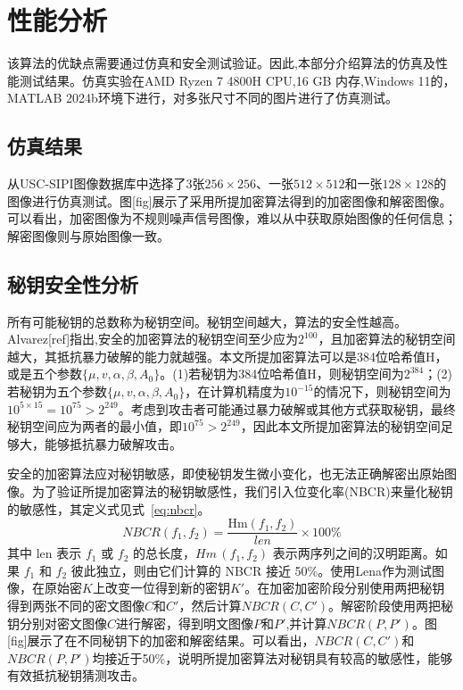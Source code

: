 \section{性能分析}
\label{sec:performance_analysis}

该算法的优缺点需要通过仿真和安全测试验证。因此,本部分介绍算法的仿真及性能测试结果。仿真实验在AMD Ryzen 7 4800H CPU,16 GB 内存,Windows 11的，MATLAB 2024b环境下进行，对多张尺寸不同的图片进行了仿真测试。

\subsection{仿真结果}
从USC-SIPI图像数据库中选择了3张$256\times256$、一张$512\times512$和一张$128\times128$的图像进行仿真测试。图[fig]展示了采用所提加密算法得到的加密图像和解密图像。可以看出，加密图像为不规则噪声信号图像，难以从中获取原始图像的任何信息；解密图像则与原始图像一致。

\subsection{秘钥安全性分析}
所有可能秘钥的总数称为秘钥空间。秘钥空间越大，算法的安全性越高。Alvarez[ref]指出,安全的加密算法的秘钥空间至少应为$2^{100}$，且加密算法的秘钥空间越大，其抵抗暴力破解的能力就越强。本文所提加密算法可以是384位哈希值H，或是五个参数$\{\mu,v,\alpha,\beta,A_0\}$。(1)若秘钥为384位哈希值H，则秘钥空间为$2^{384}$；(2)若秘钥为五个参数$\{\mu,v,\alpha,\beta,A_0\}$，在计算机精度为$10^{-15}$的情况下，则秘钥空间为$10^{5 \times 15} = 10^{75} > 2^{249}$。考虑到攻击者可能通过暴力破解或其他方式获取秘钥，最终秘钥空间应为两者的最小值，即$10^{75} > 2^{249}$，因此本文所提加密算法的秘钥空间足够大，能够抵抗暴力破解攻击。

安全的加密算法应对秘钥敏感，即使秘钥发生微小变化，也无法正确解密出原始图像。为了验证所提加密算法的秘钥敏感性，我们引入位变化率(NBCR)来量化秘钥的敏感性，其定义式见式~\eqref{eq:nbcr}。
\begin{equation}
    NBCR(f_1, f_2) = \frac{\mathrm{Hm}(f_1, f_2)}{len} \times 100\%
    \label{eq:nbcr}
\end{equation}
其中 $\text{len}$ 表示 $f_1$ 或 $f_2$ 的总长度，$Hm\,(f_1, f_2)$ 表示两序列之间的汉明距离。如果 $f_1$ 和 $f_2$ 彼此独立，则由它们计算的 NBCR 接近 50\%。使用Lena作为测试图像，在原始密$K$上改变一位得到新的密钥$K'$。在加密加密阶段分别使用两把秘钥得到两张不同的密文图像$C$和$C'$，然后计算$NBCR(C,C')$。解密阶段使用两把秘钥分别对密文图像$C$进行解密，得到明文图像$P$和$P'$,并计算$NBCR(P,P')$。图[fig]展示了在不同秘钥下的加密和解密结果。可以看出，$NBCR(C,C')$和$NBCR(P,P')$均接近于50\%，说明所提加密算法对秘钥具有较高的敏感性，能够有效抵抗秘钥猜测攻击。


